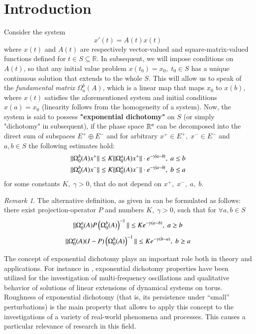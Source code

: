 \documentclass{elsarticle}
\theoremstyle{remark}
\newtheorem{remark}{Remark}
\begin{document}
\section{Introduction}
Consider the system 
\[x'(t)=A(t)x(t)\]
where $x(t)$ and $A(t)$ are respectively vector-valued and square-matrix-valued functions defined for $t\in S\subseteq\mathbb{R}$.
In subsequent, we will impose conditions on $A(t)$, so that any initial value problem $x(t_0)=x_0,\;t_0\in S$ has a unique
continuous solution
that extends to the whole $S$. This will allow us to speak of the \textit{fundamental matrix} $\Omega_a^b(A)$, which is a linear map
that maps $x_0$ to $x(b)$, where $x(t)$ satisfies the aforementioned system and initial conditions
$x(a)=x_0$ (linearity follows from the homogeneity of
a system).
Now, the system is
 said to possess \textbf{"exponential dichotomy"} on $S$ (or simply "dichotomy" in subsequent), if the phase space $\mathbb{R}^n$
can be decomposed into the direct sum of subspaces
$E^+\oplus E^-$ and for arbitrary $x^+\in E^+,\; x^-\in E^-$ and $a,b\in S$ the following estimates hold:
\begin{equation}\begin{aligned}\label{DichotomyDef}
	\|\Omega^b_0(A)x^+\|\leq K\|\Omega_0^a(A)x^+\|\cdot e^{-\gamma\left|a-b\right|},\;a\leq b\\
	\|\Omega^b_0(A)x^-\|\leq K\|\Omega_0^a(A)x^-\|\cdot e^{-\gamma\left|a-b\right|},\;b\leq a\\
\end{aligned}\end{equation}
for some constants $K,\;\gamma>0$, that do not depend on $x^+,\;x^-,\;a,\;b$.

\begin{remark}The alternative definition, as given in \cite{coppel1978dichotomies} can be formulated as follows: there exist projection-operator $P$ and numbers
$K,\;\gamma>0$, such that
 for $\forall a,b\in S$
\[\|\Omega_0^a(A)P\left(\Omega_0^b(A)\right)^{-1}\|\leq K e^{-\gamma(a-b)},\;a\geq b\]
\[\|\Omega_0^a(A)(I-P)\left(\Omega_0^b(A)\right)^{-1}\|\leq K e^{-\gamma(b-a)},\;b\geq a\]
\end{remark}

The concept of exponential dichotomy plays an important role both in theory and applications. For instance
 in \cite{mitropolsky2002dichotomies},
 exponential dichotomy properties have been utilized
 for the investigation of multi-frequency oscillations and qualitative behavior of solutions of linear extensions of dynamical
 systems on torus. Roughness of exponential dichotomy (that is, its persistence under ``small'' perturbations) is the main
 property that allows to apply this concept to the investigations of
 a variety of real-world phenomena and processes. This causes a particular relevance of research in this field. 
\end{document}
